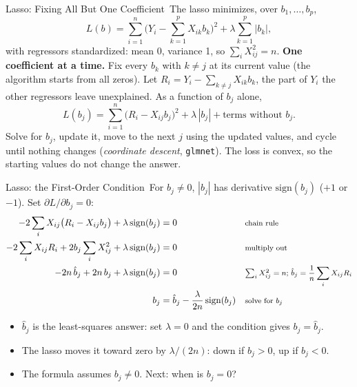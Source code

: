 \documentclass[aspectratio=169,11pt,xcolor=dvipsnames]{beamer}
\newcommand{\adv}{\,\raisebox{0.6pt}{\textcolor{accent}{$\bigstar$}}}
\newcommand{\core}{\,\raisebox{0.6pt}{\textcolor{corestar}{$\bigstar$}}}
\begin{document}
\begin{frame}{Lasso: Fixing All But One Coefficient\core}
The lasso minimizes, over $b_1, \dots, b_p$,
\[
  L(b) = \sum_{i=1}^n \Big(Y_i - \sum_{k=1}^p X_{ik} b_k\Big)^2 + \lambda \sum_{k=1}^p |b_k| ,
\]
with regressors standardized: mean 0, variance 1, so $\sum_i X_{ij}^2 = n$.
\vskip4pt
\textbf{One coefficient at a time.} Fix every $b_k$ with $k \neq j$ at its current value (the
algorithm starts from all zeros). Let $R_i = Y_i - \sum_{k\neq j} X_{ik} b_k$, the part of $Y_i$
the other regressors leave unexplained. As a function of $b_j$ alone,
\[
  L(b_j) = \sum_{i=1}^n \big(R_i - X_{ij} b_j\big)^2 + \lambda\,|b_j| + \text{terms without } b_j .
\]
{\small Solve for $b_j$, update it, move to the next $j$ using the updated values, and cycle
until nothing changes (\textit{coordinate descent}, \texttt{glmnet}). The loss is convex, so the
starting values do not change the answer.}
\end{frame}

\begin{frame}{Lasso: the First-Order Condition\adv}
For $b_j \neq 0$, $|b_j|$ has derivative $\text{sign}(b_j)$ ($+1$ or $-1$). Set $\partial L/\partial b_j = 0$:
\begin{align*}
  -2\sum_i X_{ij}\big(R_i - X_{ij} b_j\big) + \lambda\,\text{sign}(b_j) &= 0
   && \text{\footnotesize chain rule} \\
  -2\sum_i X_{ij} R_i + 2 b_j \sum_i X_{ij}^2 + \lambda\,\text{sign}(b_j) &= 0
   && \text{\footnotesize multiply out} \\
  -2n\,\hat b_j + 2n\, b_j + \lambda\,\text{sign}(b_j) &= 0
   && \text{\footnotesize $\textstyle\sum_i X_{ij}^2 = n$; $\hat b_j = \frac1n \sum_i X_{ij} R_i$} \\
  b_j &= \hat b_j - \frac{\lambda}{2n}\,\text{sign}(b_j)
   && \text{\footnotesize solve for $b_j$}
\end{align*}
\begin{itemize}\itemsep3pt
  \item $\hat b_j$ is the least-squares answer: set $\lambda = 0$ and the condition gives $b_j = \hat b_j$.
  \item The lasso moves it toward zero by $\lambda/(2n)$: down if $b_j > 0$, up if $b_j < 0$.
  \item The formula assumes $b_j \neq 0$. Next: when is $b_j = 0$?
\end{itemize}
\end{frame}
\end{document}
